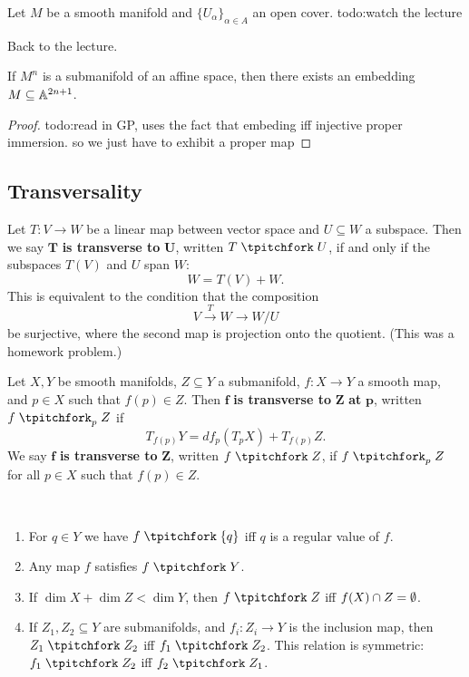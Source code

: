\begin{theorem}
    Let $M$ be a smooth manifold and $\{U_{\alpha }\} _{\alpha \in A}$ an open cover. {\color{red}todo:watch the lecture} 
\end{theorem}
Back to the lecture.
\begin{theorem}
    If $M^n $ is a submanifold of an affine space, then there exists an embedding $M \subseteq \mathbb{A}^{2n+1}$.
\end{theorem}
\begin{proof}
    {\color{red}todo:read in GP, uses the fact that embeding iff injective proper immersion. so we just have to exhibit a proper map} 
\end{proof}
\subsection{Transversality}
\begin{definition}
    Let $T \colon V \to W$ be a linear map between vector space and $U \subseteq W$ a subspace. Then we say $\mathbf T$ \textbf{is transverse to} $\mathbf U$, written $T \transv U$, if and only if the subspaces $T(V)$ and $U$ span $W$: \[
        W=T(V)+W.
    \] This is equivalent to the condition that the composition \[
    V \overset{T}{\longrightarrow} W \longrightarrow W /U
\] be surjective, where the second map is projection onto the quotient. (This was a homework problem.)
\end{definition}
\begin{definition}[]
    Let $X,Y$ be smooth manifolds, $Z \subseteq Y$ a submanifold, $f \colon X \to Y$ a smooth map, and $p \in X$ such that $f(p) \in Z$. Then $\mathbf f$ \textbf{is transverse to} $\mathbf Z$ \textbf{at} $\mathbf p$, written $f \transv_p Z$ if \[
        T_{f(p)}Y=df_p(T_pX)+T_{f(p)}Z.
    \] We say $\mathbf f$ \textbf{is transverse to} $\mathbf Z$, written $f\transv Z$, if $f \transv_p Z$ for all $p \in X$ such that $f(p) \in Z$.
\end{definition}
\begin{remark}\,
    \begin{enumerate}[label=(\arabic*)]
        \setlength\itemsep{-.2em}
        \item For $q \in Y$ we have $f \transv \{q\} $ iff $q$ is a regular value of $f$.
        \item Any map $f$ satisfies $f \transv Y$.
        \item If $\dim X + \dim Z < \dim Y$, then $f \transv Z$ iff $f(X) \cap Z=\emptyset$.
        \item If $Z_1,Z_2\subseteq Y$ are submanifolds, and $f_i \colon Z_i  \to Y$ is the inclusion map, then $Z_1 \transv Z_2$ iff $f_1 \transv Z_2$. This relation is symmetric: $f_1\transv Z_2$ iff $f_2 \transv Z_1$.
    \end{enumerate}
\end{remark}
